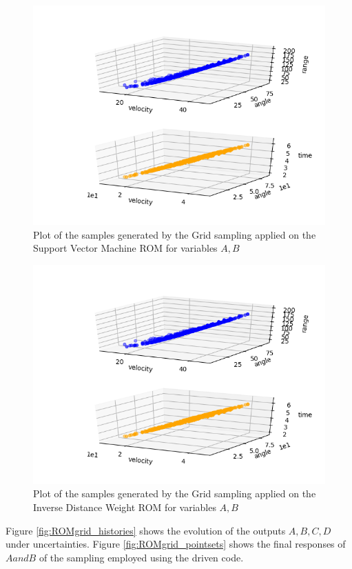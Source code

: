  \begin{figure}[h!]
  \centering
  \includegraphics[scale=0.7]{../../tests/framework/user_guide/ReducedOrderModeling/gold/ROMConstruction/1-samplesPlot3DROMsvm_scatter-scatter.png}
  \caption{Plot of the samples generated by the Grid sampling applied on the Support Vector Machine ROM for variables $A,B$}
  \label{fig:ROMsvm_samples}
 \end{figure}
 \begin{figure}[h!]
  \centering
  \includegraphics[scale=0.7]{../../tests/framework/user_guide/ReducedOrderModeling/gold/ROMConstruction/1-samplesPlot3DROMinverse_scatter-scatter.png}
  \caption{Plot of the samples generated by the Grid sampling applied on the Inverse Distance Weight ROM for variables $A,B$}
  \label{fig:ROMinverse_samples}
 \end{figure}
 Figure \ref{fig:ROMgrid_histories}
 shows the evolution of the outputs $A,B,C,D$ under uncertainties.
 Figure \ref{fig:ROMgrid_pointsets} shows the final responses  of $A and B$
 of the sampling employed using the driven code.


